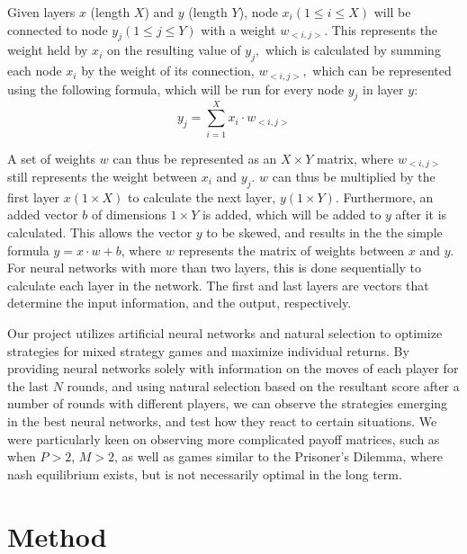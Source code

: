 \documentclass{article}
\begin{document}
Given layers $x$ (length $X$) and $y$ (length $Y$), node $x_i(1\leq i \leq X)$ will be connected to node $y_j (1\leq j \leq Y)$ with a weight $w_{<i,j>}$. This represents the weight held by $x_i$ on the resulting value of $y_j,$ which is calculated by summing each node $x_i$ by the weight of its connection, $w_{<i,j>},$ which can be represented using the following formula, which will be run for every node $y_j$ in layer $y$: $$y_j=\sum_{i=1}^X x_i\cdot w_{<i,j>}$$

A set of weights $w$ can thus be represented as an $X\times Y$ matrix, where $w_{<i,j>}$ still represents the weight between $x_i$ and $y_j$. $w$ can thus be multiplied by the first layer $x (1\times X)$ to calculate the next layer, $y (1\times Y)$. Furthermore, an added vector $b$ of dimensions $1\times Y$ is added, which will be added to $y$ after it is calculated. This allows the vector $y$ to be skewed, and results in the the simple formula $y = x\cdot w+b$, where $w$ represents the matrix of weights between $x$ and $y$. For neural networks with more than two layers, this is done sequentially to calculate each layer in the network. The first and last layers are vectors that determine the input information, and the output, respectively.

Our project utilizes artificial neural networks and natural selection to optimize strategies for mixed strategy games and maximize individual returns. By providing neural networks solely with information on the moves of each player for the last $N$ rounds, and using natural selection based on the resultant score after a number of rounds with different players, we can observe the strategies emerging in the best neural networks, and test how they react to certain situations. We were particularly keen on observing more complicated payoff matrices, such as when $P>2$, $M>2$, as well as games similar to the Prisoner's Dilemma, where nash equilibrium exists, but is not necessarily optimal in the long term.

\section{Method}
\end{document}
